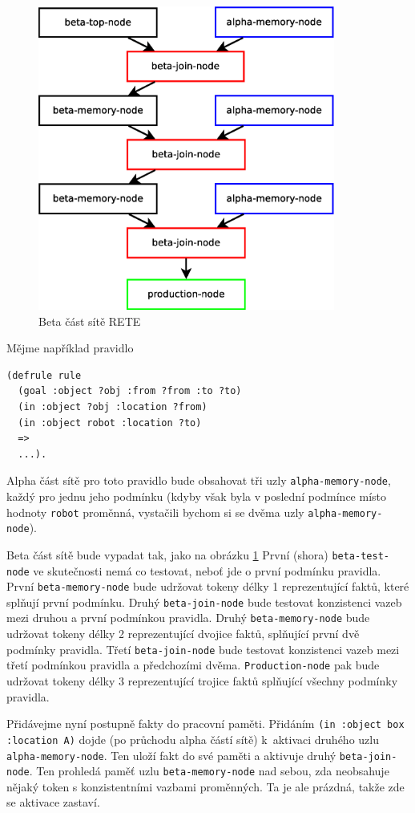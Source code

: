 \begin{figure}[h]
\centering
\includegraphics[height=10cm]{rete-beta.eps}
\caption{Beta část sítě RETE}
\label{rete-beta}
\end{figure}

Mějme například pravidlo
\begin{verbatim}
(defrule rule
  (goal :object ?obj :from ?from :to ?to)
  (in :object ?obj :location ?from)
  (in :object robot :location ?to)
  =>
  ...).
\end{verbatim}
Alpha část sítě pro toto pravidlo bude obsahovat tři uzly \verb|alpha-memory-node|,
každý pro jednu jeho podmínku (kdyby však byla v poslední podmínce místo hodnoty
\verb|robot| proměnná, vystačili bychom si se dvěma uzly \verb|alpha-memory-node|).

Beta část sítě bude vypadat tak, jako na obrázku \ref{rete-beta} První (shora)
\verb|beta-test-node| ve skutečnosti nemá co testovat, neboť jde o první
podmínku pravidla. První \verb|beta-memory-node| bude udržovat tokeny délky 1
reprezentující  faktů, které splňují první podmínku. Druhý
\verb|beta-join-node| bude testovat konzistenci vazeb mezi druhou a první
podmínkou pravidla. Druhý \verb|beta-memory-node| bude udržovat tokeny délky 2
reprezentující dvojice faktů, splňující první dvě podmínky pravidla. Třetí
\verb|beta-join-node| bude testovat konzistenci vazeb mezi třetí podmínkou
pravidla a předchozími dvěma. \verb|Production-node| pak bude udržovat tokeny
délky 3 reprezentující trojice faktů splňující všechny podmínky pravidla.

Přidávejme nyní postupně fakty do pracovní paměti. Přidáním
\verb|(in :object box :location A)| dojde (po průchodu alpha částí sítě)
k~aktivaci druhého uzlu \verb|alpha-memory-node|. Ten uloží fakt do své paměti a
aktivuje  druhý \verb|beta-join-node|. Ten prohledá paměť uzlu
\verb|beta-memory-node| nad sebou, zda neobsahuje nějaký token s konzistentními
vazbami proměnných. Ta je ale prázdná, takže zde se aktivace zastaví.

